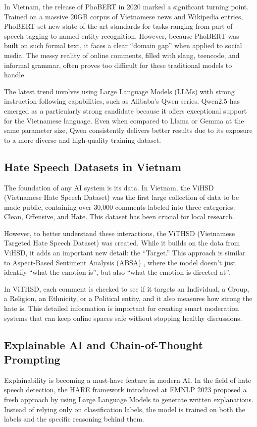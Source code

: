 \documentclass[11pt]{article}
\begin{document}
In Vietnam, the release of PhoBERT \citep{nguyen2020phobert} in 2020 marked a significant turning point. Trained on a
massive 20GB corpus of Vietnamese news and Wikipedia entries, PhoBERT set new
state-of-the-art standards for tasks ranging from part-of-speech tagging to named entity
recognition. However, because PhoBERT was built on such formal text, it faces a clear
``domain gap'' when applied to social media. The messy reality of online comments, filled with
slang, teencode, and informal grammar, often proves too difficult for these traditional models
to handle.

The latest trend involves using Large Language Models (LLMs) with strong
instruction-following capabilities, such as Alibaba's Qwen series. Qwen2.5 \citep{Yang2025Qwen25} has emerged as a
particularly strong candidate because it offers exceptional support for the Vietnamese
language. Even when compared to Llama \citep{llama} or Gemma \citep{Mesnard2024Gemma} at the same parameter size, Qwen 
consistently delivers better results due to its exposure to a more diverse and high-quality
training dataset.

\subsection{Hate Speech Datasets in Vietnam}
The foundation of any AI system is its data. In Vietnam, the ViHSD (Vietnamese Hate Speech
Dataset) \citep{10.1007/978-3-030-79457-6_35} was the first large collection of data to be made public, containing over 30,000
comments labeled into three categories: Clean, Offensive, and Hate. This dataset has been
crucial for local research.

However, to better understand these interactions, the ViTHSD \citep{vithsd} (Vietnamese Targeted Hate
Speech Dataset) was created. While it builds on the data from ViHSD, it adds an important
new detail: the ``Target.'' This approach is similar to Aspect-Based Sentiment Analysis (ABSA) \citep{Pontiki2014SemEval4},
where the model doesn't just identify ``what the emotion is'', but also ``what the emotion is
directed at''.

In ViTHSD, each comment is checked to see if it targets an Individual, a Group, a Religion, an
Ethnicity, or a Political entity, and it also measures how strong the hate is. This detailed
information is important for creating smart moderation systems that can keep online spaces
safe without stopping healthy discussions.

\subsection{Explainable AI and Chain-of-Thought Prompting}
Explainability is becoming a must-have feature in modern AI. In the field of hate speech
detection, the HARE framework \citep{Yang2023HARE} introduced at EMNLP 2023 proposed a fresh approach by
using Large Language Models to generate written explanations. Instead of relying only on
classification labels, the model is trained on both the labels and the specific reasoning behind
them.
\end{document}
